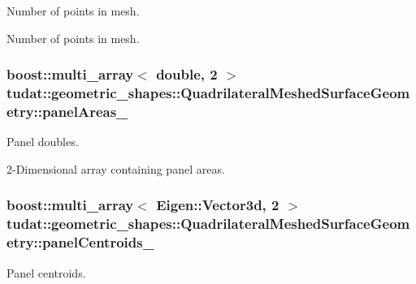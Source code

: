 Number of points in mesh. 

Number of points in mesh. 
\subsubsection[{\texorpdfstring{panel\+Areas\+\_\+}{panelAreas_}}]{\setlength{\rightskip}{0pt plus 5cm}boost\+::multi\+\_\+array$<$ double, 2 $>$ tudat\+::geometric\+\_\+shapes\+::\+Quadrilateral\+Meshed\+Surface\+Geometry\+::panel\+Areas\+\_\+\hspace{0.3cm}{\ttfamily [protected]}}\hypertarget{classtudat_1_1geometric__shapes_1_1QuadrilateralMeshedSurfaceGeometry_a9da840716adb5449b740250976e3111c}{}\label{classtudat_1_1geometric__shapes_1_1QuadrilateralMeshedSurfaceGeometry_a9da840716adb5449b740250976e3111c}


Panel doubles. 

2-\/\+Dimensional array containing panel areas. 
\subsubsection[{\texorpdfstring{panel\+Centroids\+\_\+}{panelCentroids_}}]{\setlength{\rightskip}{0pt plus 5cm}boost\+::multi\+\_\+array$<$ Eigen\+::\+Vector3d, 2 $>$ tudat\+::geometric\+\_\+shapes\+::\+Quadrilateral\+Meshed\+Surface\+Geometry\+::panel\+Centroids\+\_\+\hspace{0.3cm}{\ttfamily [protected]}}\hypertarget{classtudat_1_1geometric__shapes_1_1QuadrilateralMeshedSurfaceGeometry_a715ff3e3943b8c60fe5bcd0f64163a67}{}\label{classtudat_1_1geometric__shapes_1_1QuadrilateralMeshedSurfaceGeometry_a715ff3e3943b8c60fe5bcd0f64163a67}


Panel centroids. 

